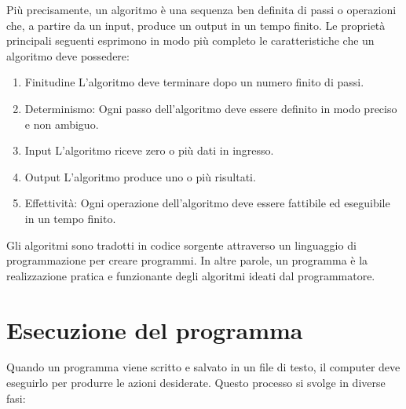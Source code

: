 \documentclass[
  letterpaper,
]{scrbook}
\providecommand{\tightlist}{%
  \setlength{\itemsep}{0pt}\setlength{\parskip}{0pt}}\usepackage{longtable,booktabs,array}
\begin{document}
Più precisamente, un algoritmo è una sequenza ben definita di passi o
operazioni che, a partire da un input, produce un output in un tempo
finito. Le proprietà principali seguenti esprimono in modo più completo
le caratteristiche che un algoritmo deve possedere:

\begin{enumerate}
\def\labelenumi{\arabic{enumi}.}
\tightlist
\item
  Finitudine L'algoritmo deve terminare dopo un numero finito di passi.
\item
  Determinismo: Ogni passo dell'algoritmo deve essere definito in modo
  preciso e non ambiguo.
\item
  Input L'algoritmo riceve zero o più dati in ingresso.
\item
  Output L'algoritmo produce uno o più risultati.
\item
  Effettività: Ogni operazione dell'algoritmo deve essere fattibile ed
  eseguibile in un tempo finito.
\end{enumerate}

Gli algoritmi sono tradotti in codice sorgente attraverso un linguaggio
di programmazione per creare programmi. In altre parole, un programma è
la realizzazione pratica e funzionante degli algoritmi ideati dal
programmatore.

\section{Esecuzione del programma}\label{esecuzione-del-programma}

Quando un programma viene scritto e salvato in un file di testo, il
computer deve eseguirlo per produrre le azioni desiderate. Questo
processo si svolge in diverse fasi:
\end{document}
